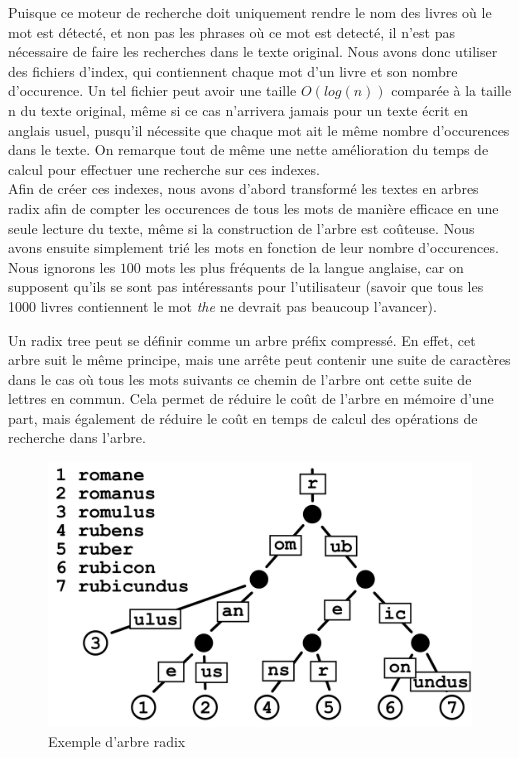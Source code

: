 \documentclass{article}
\begin{document}
Puisque ce moteur de recherche doit uniquement rendre le nom des livres où le mot est détecté, et non pas les phrases où ce mot est detecté, il n'est pas nécessaire de faire les recherches dans le texte original. Nous avons donc utiliser des fichiers d'index, qui contiennent chaque mot d'un livre et son nombre d'occurence. Un tel fichier peut avoir une taille $O(log(n))$ comparée à la taille n du texte original, même si ce cas n'arrivera jamais pour un texte écrit en anglais usuel, pusqu'il nécessite que chaque mot ait le même nombre d'occurences dans le texte. On remarque tout de même une nette amélioration du temps de calcul pour effectuer une recherche sur ces indexes.\\

Afin de créer ces indexes, nous avons d'abord transformé les textes en arbres radix afin de compter les occurences de tous les mots de manière efficace en une seule lecture du texte, même si la construction de l'arbre est coûteuse. Nous avons ensuite simplement trié les mots en fonction de leur nombre d'occurences. Nous ignorons les $100$ mots les plus fréquents de la langue anglaise, car on supposent qu'ils se sont pas intéressants pour l'utilisateur (savoir que tous les 1000 livres contiennent le mot \textit{the} ne devrait pas beaucoup l'avancer).

Un radix tree peut se définir comme un arbre préfix compressé. En effet, cet arbre suit le même principe, mais une arrête peut contenir une suite de caractères dans le cas où tous les mots suivants ce chemin de l'arbre ont cette suite de lettres en commun. Cela permet de réduire le coût de l'arbre en mémoire d'une part, mais également de réduire le coût en temps de calcul des opérations de recherche dans l'arbre.

\begin{figure}[!h]
  \centering
  \includegraphics[width=.3\paperwidth]{radix_tree.png}
  \caption{Exemple d'arbre radix}
\end{figure}
\end{document}
